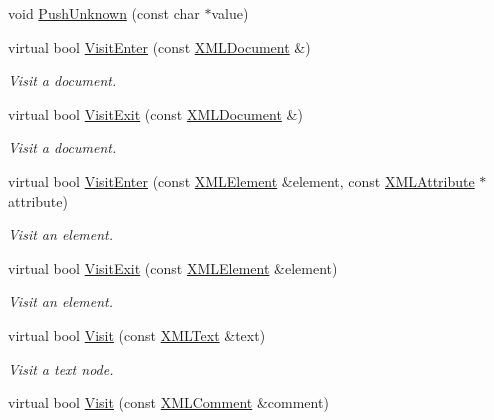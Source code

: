 \begin{DoxyCompactItemize}
\item 
void \hyperlink{classtinyxml2_1_1_x_m_l_printer_ab1efc6d1548505e9984185f58f54b713}{Push\-Unknown} (const char $\ast$value)
\item 
virtual bool \hyperlink{classtinyxml2_1_1_x_m_l_printer_a9aa1de11a55a07db55a90fde37d7afad}{Visit\-Enter} (const \hyperlink{classtinyxml2_1_1_x_m_l_document}{X\-M\-L\-Document} \&)
\begin{DoxyCompactList}\small\item\em Visit a document. \end{DoxyCompactList}\item 
virtual bool \hyperlink{classtinyxml2_1_1_x_m_l_printer_a15fc1f2b922f540917dcf52808737b29}{Visit\-Exit} (const \hyperlink{classtinyxml2_1_1_x_m_l_document}{X\-M\-L\-Document} \&)
\begin{DoxyCompactList}\small\item\em Visit a document. \end{DoxyCompactList}\item 
virtual bool \hyperlink{classtinyxml2_1_1_x_m_l_printer_a169b2509d8eabb70811b2bb8cfd1f5d1}{Visit\-Enter} (const \hyperlink{classtinyxml2_1_1_x_m_l_element}{X\-M\-L\-Element} \&element, const \hyperlink{classtinyxml2_1_1_x_m_l_attribute}{X\-M\-L\-Attribute} $\ast$attribute)
\begin{DoxyCompactList}\small\item\em Visit an element. \end{DoxyCompactList}\item 
virtual bool \hyperlink{classtinyxml2_1_1_x_m_l_printer_a2edd48405971a88951c71c9df86a2f50}{Visit\-Exit} (const \hyperlink{classtinyxml2_1_1_x_m_l_element}{X\-M\-L\-Element} \&element)
\begin{DoxyCompactList}\small\item\em Visit an element. \end{DoxyCompactList}\item 
virtual bool \hyperlink{classtinyxml2_1_1_x_m_l_printer_adc0e42b4f6fcb90a95630c79575d030b}{Visit} (const \hyperlink{classtinyxml2_1_1_x_m_l_text}{X\-M\-L\-Text} \&text)
\begin{DoxyCompactList}\small\item\em Visit a text node. \end{DoxyCompactList}\item 
virtual bool \hyperlink{classtinyxml2_1_1_x_m_l_printer_aa294c5c01af0ebb9114902456e4cb53c}{Visit} (const \hyperlink{classtinyxml2_1_1_x_m_l_comment}{X\-M\-L\-Comment} \&comment)

\end{DoxyCompactItemize}
